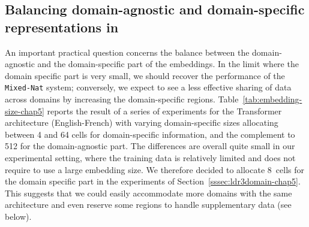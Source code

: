 \subsection{Balancing domain-agnostic and domain-specific representations in \label{secc:region_size-chap5}}
An important practical question concerns the balance between the domain-agnostic and the domain-specific part of the embeddings. 
In the limit where the domain specific part is very small, we should recover the performance of the \texttt{Mixed-Nat} system; 
conversely, we expect to see a less effective sharing of data across domains by increasing the domain-specific regions. 
Table~\ref{tab:embedding-size-chap5} reports the result of  a series of experiments for the Transformer architecture (English-French) with varying domain-specific sizes allocating between 4 and 64 cells for domain-specific information, and the complement to 512 for the domain-agnostic part. 
The differences are overall quite small in our experimental setting, where the training data is relatively limited and does not require to use a large embedding size. 
We therefore decided to allocate $8$~cells for the domain specific part in the experiments of Section~\ref{sssec:ldr3domain-chap5}. 
This suggests that we could easily accommodate more domains with the same architecture and even reserve some regions to handle supplementary data (see below). %

\begin{table}[!h]
\begin{center}
\end{center}
\caption{BLEU scores for the Transformer architecture for varying domain-specific embedding sizes \label{tab:embedding-size-chap5}}
\end{table}

